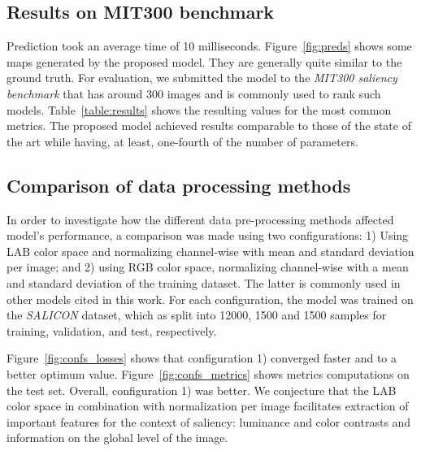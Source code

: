 \documentclass[10pt,twocolumn,letterpaper]{article}
\begin{document}
\subsection{Results on MIT300 benchmark}
Prediction took an average time of 10 milliseconds.
Figure~\ref{fig:preds} shows some maps generated by the proposed model.
They are generally quite similar to the ground truth. For evaluation, we submitted the model to the \emph{MIT300 saliency benchmark} that has around 300 images and is commonly used to rank such models. Table~\ref{table:results} shows the resulting values for the most common metrics.
The proposed model achieved results comparable to those of the state of the art while having, at least, one-fourth of the number of parameters.

\subsection{Comparison of data processing methods}
\label{sec:dataproc_compar}
In order to investigate how the different data pre-processing methods
affected model's performance, a comparison was made using two configurations:
1) Using LAB color space and normalizing channel-wise with mean and standard
deviation per image; and 2) using RGB color space, normalizing channel-wise
with a mean and standard deviation of the training dataset.
The latter is commonly used in other models cited in this work.
For each configuration, the model was trained on the
\emph{SALICON} dataset, which as split into
12000, 1500 and 1500 samples for training, validation, and test, respectively.

Figure~\ref{fig:confs_losses} shows that configuration 1) converged faster
and to a better optimum value.
Figure~\ref{fig:confs_metrics} shows metrics computations on the test set.
Overall, configuration 1) was better.
We conjecture that the LAB color space in combination with normalization per
image facilitates extraction of important features for the context
of saliency: luminance and color contrasts and information on the global level
of the image.
\end{document}
